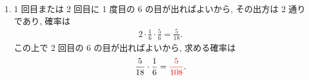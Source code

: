 \begin{qenumerate}
{\begin{enumerate}
{				1, 2 回目には 6 以外の目が出ればよいから, 求める確率は
				\begin{align}
					\left(\frac{5}{6}\right)^{2}\cdot\frac{1}{6} = \red{\frac{25}{216}}.
				\end{align}
			}
			\item{
				1 回目または 2 回目に 1 度目の 6 の目が出ればよいから, その出方は 2 通りであり, 確率は
				\begin{align}
					2\cdot\frac{1}{6}\cdot\frac{5}{6} = \frac{5}{18}.
				\end{align}
				この上で 2 回目の 6 の目が出ればよいから, 求める確率は
				\begin{align}
					\frac{5}{18}\cdot\frac{1}{6} = \textcolor{red}{\frac{5}{108}}.
				\end{align}
			}
		\end{enumerate}
	}
\end{qenumerate}

